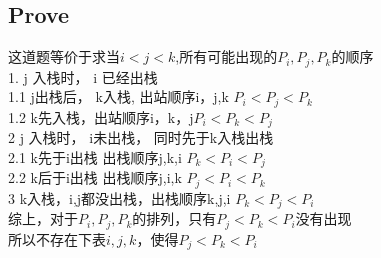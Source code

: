 \documentclass[a4paper]{article}
\begin{document}
\subsection*{Prove}
这道题等价于求当$i<j<k$,所有可能出现的$P_i,P_j,P_k$的顺序\\
1. j 入栈时， i 已经出栈\\
1.1 j出栈后， k入栈, 出站顺序i，j,k $P_i<P_j<P_k$\\
1.2 k先入栈，出站顺序i，k，j$P_i<P_k<P_j$\\
2 j 入栈时， i未出栈， 同时先于k入栈出栈 \\
2.1 k先于i出栈 出栈顺序j,k,i  $P_k<P_i<P_j$\\
2.2 k后于i出栈 出栈顺序j,i,k  $P_j<P_i<P_k$ \\
3 k入栈，i,j都没出栈，出栈顺序k,j,i $P_k<P_j<P_i$\\
综上，对于$P_i,P_j,P_k$的排列，只有$P_j<P_k<P_i$没有出现\\
所以不存在下表$i,j,k$，使得$P_j<P_k<P_i$\\
\end{document}
